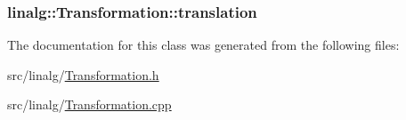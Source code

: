 \subsubsection[{\texorpdfstring{translation}{translation}}]{ linalg\+::\+Transformation\+::translation\hspace{0.3cm}{\ttfamily [private]}}\hypertarget{classlinalg_1_1Transformation_a462cf5d72735591b01bef5186bb1fe98}{}\label{classlinalg_1_1Transformation_a462cf5d72735591b01bef5186bb1fe98}


The documentation for this class was generated from the following files\+:\begin{DoxyCompactItemize}
\item 
src/linalg/\hyperlink{Transformation_8h}{Transformation.\+h}\item 
src/linalg/\hyperlink{Transformation_8cpp}{Transformation.\+cpp}\end{DoxyCompactItemize}
